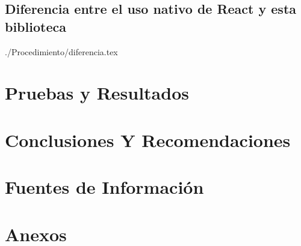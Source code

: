 \documentclass[a4paper,12pt, listof=totoc]{report}
\begin{document}
			\section {Diferencia entre el uso nativo de React y esta biblioteca}
				 {./Procedimiento/diferencia.tex}
			
		
		\chapter {Pruebas y Resultados}
			
		
		\chapter {Conclusiones Y Recomendaciones}
			
		
		\chapter {Fuentes de Información}
			
			
		\chapter {Anexos}
\end{document}
